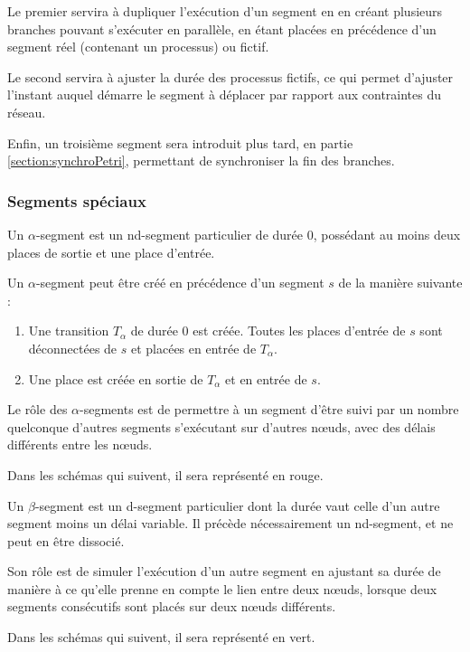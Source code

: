 Le premier servira à dupliquer l'exécution d'un segment en en créant plusieurs branches pouvant s'exécuter en parallèle, en étant placées en précédence d'un segment réel (contenant un processus) ou fictif.

Le second servira à ajuster la durée des processus fictifs, ce qui permet d'ajuster l'instant auquel démarre le segment à déplacer par rapport aux contraintes du réseau.

Enfin, un troisième segment sera introduit plus tard, en partie \ref{section:synchroPetri}, permettant de synchroniser la fin des branches.

\subsubsection{Segments spéciaux}
\label{section:alphasegment}
\begin{mydef}
Un $\alpha$-segment est un nd-segment particulier de durée $0$, possédant au moins deux places de sortie et une place d'entrée.
\end{mydef}
Un $\alpha$-segment peut être créé en précédence d'un segment $s$ de la manière suivante : 
\begin{enumerate}
\item Une transition $T_\alpha$ de durée 0 est créée. Toutes les places d'entrée de $s$ sont déconnectées de $s$ et placées en entrée de $T_\alpha$.
\item Une place est créée en sortie de $T_\alpha$ et en entrée de $s$. 
\end{enumerate}

Le rôle des $\alpha$-segments est de permettre à un segment d'être suivi par un nombre quelconque d'autres segments s'exécutant sur d'autres nœuds, avec des délais différents entre les nœuds.

Dans les schémas qui suivent, il sera représenté en \textcolor{BrickRed}{rouge}.

\begin{mydef}
Un $\beta$-segment est un d-segment particulier dont la durée vaut celle d'un autre segment moins un délai variable. Il précède nécessairement un nd-segment, et ne peut en être dissocié.
\end{mydef}
Son rôle est de simuler l'exécution d'un autre segment en ajustant sa durée de manière à ce qu'elle prenne en compte le lien entre deux nœuds, lorsque deux segments consécutifs sont placés sur deux nœuds différents.

Dans les schémas qui suivent, il sera représenté en \textcolor{OliveGreen}{vert}.
